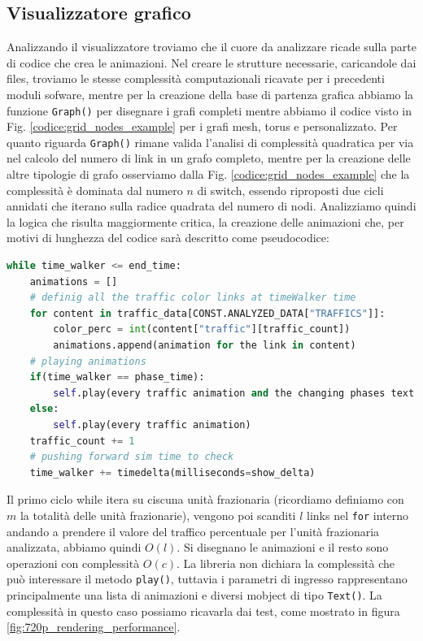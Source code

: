 \documentclass[binding=0.6cm]{sapthesis}
\begin{document}
\subsection{Visualizzatore grafico}
Analizzando il visualizzatore troviamo che il cuore da analizzare ricade sulla parte di codice che crea le animazioni. Nel creare le strutture necessarie, caricandole dai files,
troviamo le stesse complessità computazionali ricavate per i precedenti moduli sofware, mentre per la creazione della base di partenza grafica abbiamo
la funzione \lstinline|Graph()| per disegnare i grafi completi mentre abbiamo il codice visto in Fig. \ref{codice:grid_nodes_example} per i grafi mesh, torus e personalizzato.
Per quanto riguarda \lstinline|Graph()| rimane valida l'analisi di complessità quadratica per via nel calcolo del numero di link in un grafo completo, mentre per la creazione delle altre tipologie di grafo
osserviamo dalla Fig. \ref{codice:grid_nodes_example} che la complessità è dominata dal numero \(n\) di switch, essendo riproposti due cicli annidati che iterano sulla radice quadrata
del numero di nodi. 
Analizziamo quindi la logica che risulta maggiormente critica, la creazione delle animazioni che,
per motivi di lunghezza del codice sarà descritto come pseudocodice:

{\scriptsize
\begin{lstlisting}[language=Python, basicstyle=\ttfamily, caption={Logica creazione animazioni}, label={codice:create_animation}, breaklines=true]
while time_walker <= end_time:
    animations = []
    # definig all the traffic color links at timeWalker time
    for content in traffic_data[CONST.ANALYZED_DATA["TRAFFICS"]]:
        color_perc = int(content["traffic"][traffic_count])
        animations.append(animation for the link in content)
    # playing animations
    if(time_walker == phase_time):
        self.play(every traffic animation and the changing phases text animation)
    else:
        self.play(every traffic animation)
    traffic_count += 1
    # pushing forward sim time to check
    time_walker += timedelta(milliseconds=show_delta)
\end{lstlisting}
}

Il primo ciclo while itera su ciscuna unità frazionaria (ricordiamo definiamo con \(m\) la totalità delle unità frazionarie), vengono poi scanditi \(l\) links nel \texttt{for} interno andando a prendere il valore del traffico percentuale per l'unità frazionaria analizzata, abbiamo quindi \(O(l)\).
Si disegnano le animazioni e il resto sono operazioni con complessità \(O(c)\). La libreria non dichiara la complessità che può interessare il metodo \lstinline|play()|, tuttavia
i parametri di ingresso rappresentano principalmente una lista di animazioni e diversi mobject di tipo \lstinline|Text()|. 
La complessità in questo caso possiamo ricavarla dai test, come mostrato in figura \ref{fig:720p_rendering_performance}.
\end{document}
